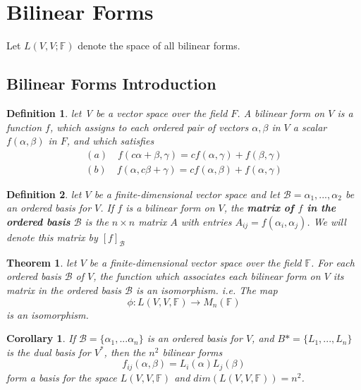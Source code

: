 \documentclass{article}
\newtheorem{theorem}{Theorem}[section]
\newtheorem{definition}{Definition}[section]
\newtheorem{corollary}{Corollary}[theorem]
\numberwithin{theorem}{subsection} %
\numberwithin{definition}{subsection} %
\numberwithin{proposition}{subsection} %
\begin{document}
\pagebreak

\section{Bilinear Forms}
Let $L(V,V;\mathbb{F})$ denote the space of all bilinear forms.

\subsection{Bilinear Forms Introduction}

\begin{definition}
    let V be a vector space over the field $F$. A bilinear form on $V$ is a function $f$,
    which assigns to each ordered pair of vectors $\alpha, \beta$ in $V$ a scalar
    $f(\alpha,\beta)$ in $F$, and which satisfies
    \begin{eqnarray*}
        (a) \quad f(c\alpha + \beta, \gamma) = cf(\alpha, \gamma) + f(\beta, \gamma) \\
        (b) \quad f(\alpha, c\beta + \gamma) = cf(\alpha, \beta) + f(\alpha, \gamma)
    \end{eqnarray*}
\end{definition}

\begin{definition}
    let $V$ be a finite-dimensional vector space and let $\mathcal{B}
    = {\alpha_1,...,\alpha_2}$ be an ordered basis for $V$. If $f$ is a bilinear form on
    $V$, the \textbf{matrix of $f$ in the ordered basis} $\mathcal{B}$ is the $n \times n$
    matrix $A$ with entries $A_{ij} = f(\alpha_i, \alpha_j)$. We will denote this matrix
    by $[f]_\mathcal{B}$
\end{definition}

\begin{theorem}
    let $V$ be a finite-dimensional vector space over the field $\mathbb{F}$. For each
    ordered basis $\mathcal{B}$ of $V$, the function which associates each bilinear form
    on $V$ its matrix in the ordered basis $\mathcal{B}$ is an isomorphism. i.e. The map
    \begin{equation*}
        \phi : L(V,V,\mathbb{F}) \rightarrow M_n(\mathbb{F})
    \end{equation*}
    is an isomorphism.
\end{theorem}

\begin{corollary}
    If $\mathcal{B} = \{\alpha_1,...\alpha_n\}$ is an ordered basis for $V$, and $B*
    = \{L_1,...,L_n\}$ is the dual basis for $V^*$, then the $n^2$ bilinear forms
        \begin{equation*}
            f_{ij}(\alpha, \beta) = L_i(\alpha)L_j(\beta)
        \end{equation*}
    form a basis for the space $L(V,V,\mathbb{F})$ and $dim(L(V,V,\mathbb{F})) = n^2$.
\end{corollary}
    
\end{document}
